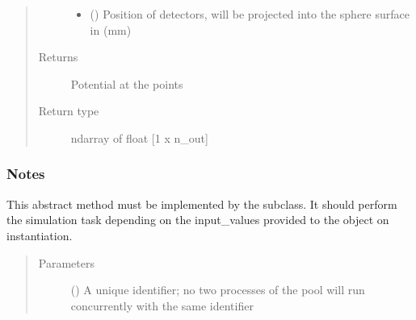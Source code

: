\documentclass[letterpaper,10pt,english,openany,oneside]{sphinxmanual}
\begin{document}
\begin{fulllineitems}
\begin{quote}
\begin{description}
\begin{itemize}
\item {} 
\sphinxstyleliteralstrong{\sphinxupquote{{[}}}\sphinxstyleliteralstrong{\sphinxupquote{{]}}} (\sphinxstyleliteralemphasis{\sphinxupquote{ {[}}}\sphinxstyleliteralemphasis{\sphinxupquote{{]}}}) \textendash{} Position of detectors, will be projected into the sphere surface in (mm)

\end{itemize}

\item[{Returns}] \leavevmode
{} \textendash{} Potential at the points

\item[{Return type}] \leavevmode
ndarray of float {[}1 x n\_out{]}

\end{description}\end{quote}
\subsubsection*{Notes}

\begin{fulllineitems}
\label{\detokenize{pygpc.testfunctions:pygpc.testfunctions.testfunctions.PotentialHomogeneousDipole.simulate}}
This abstract method must be implemented by the subclass.
It should perform the simulation task depending on the input\_values provided to the object on instantiation.
\begin{quote}\begin{description}
\item[{Parameters}] \leavevmode
{} () \textendash{} A unique identifier; no two processes of the pool will run concurrently with the same identifier

\end{description}\end{quote}

\end{fulllineitems}


\end{fulllineitems}
\end{document}
